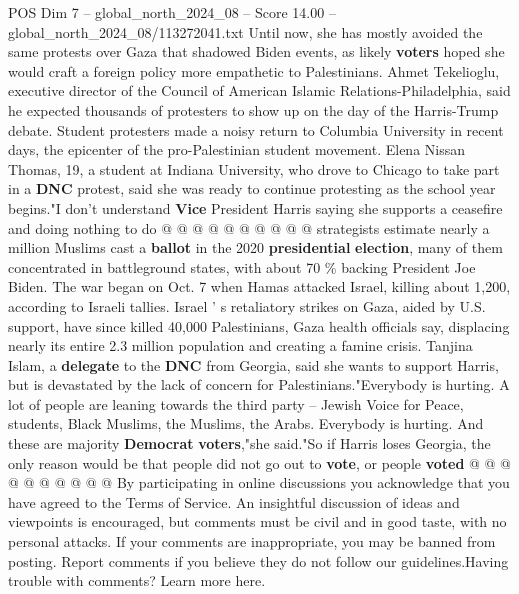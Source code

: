 \begin{textsample}{POS Dim 7 – global\_north\_2024\_08 – Score 14.00 – global\_north\_2024\_08/113272041.txt}
Until now, she has mostly avoided the same protests over Gaza that shadowed Biden events, as likely \textbf{voters} hoped she would craft a foreign policy more empathetic to Palestinians.
Ahmet Tekelioglu, executive director of the Council of American Islamic Relations-Philadelphia, said he expected thousands of protesters to show up on the day of the Harris-Trump debate.
Student protesters made a noisy return to Columbia University in recent days, the epicenter of the pro-Palestinian student movement.
Elena Nissan Thomas, 19, a student at Indiana University, who drove to Chicago to take part in a \textbf{DNC} protest, said she was ready to continue protesting as the school year begins."I don't understand \textbf{Vice} President Harris saying she supports a ceasefire and doing nothing to do @ @ @ @ @ @ @ @ @ @ strategists estimate nearly a million Muslims cast a \textbf{ballot} in the 2020 \textbf{presidential} \textbf{election}, many of them concentrated in battleground states, with about 70 \% backing President Joe Biden.
The war began on Oct. 7 when Hamas attacked Israel, killing about 1,200, according to Israeli tallies.
Israel ' s retaliatory strikes on Gaza, aided by U.S. support, have since killed 40,000 Palestinians, Gaza health officials say, displacing nearly its entire 2.3 million population and creating a famine crisis.
Tanjina Islam, a \textbf{delegate} to the \textbf{DNC} from Georgia, said she wants to support Harris, but is devastated by the lack of concern for Palestinians."Everybody is hurting.
A lot of people are leaning towards the third party -- Jewish Voice for Peace, students, Black Muslims, the Muslims, the Arabs.
Everybody is hurting.
And these are majority \textbf{Democrat} \textbf{voters},"she said."So if Harris loses Georgia, the only reason would be that people did not go out to \textbf{vote}, or people \textbf{voted} @ @ @ @ @ @ @ @ @ @ By participating in online discussions you acknowledge that you have agreed to the Terms of Service.
An insightful discussion of ideas and viewpoints is encouraged, but comments must be civil and in good taste, with no personal attacks.
If your comments are inappropriate, you may be banned from posting.
Report comments if you believe they do not follow our guidelines.Having trouble with comments?
Learn more here.

\end{textsample}
